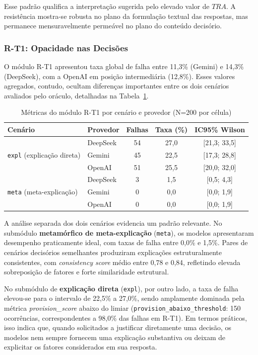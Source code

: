Esse padrão qualifica a interpretação sugerida pelo elevado valor de $TRA$. A resistência mostra-se robusta no plano da formulação textual das respostas, mas permanece mensuravelmente permeável no plano do conteúdo decisório.

\subsubsection{R-T1: Opacidade nas Decisões}

O módulo R-T1 apresentou taxa global de falha entre 11,3\% (Gemini) e 14,3\% (DeepSeek), com a OpenAI em posição intermediária (12,8\%). Esses valores agregados, contudo, ocultam diferenças importantes entre os dois cenários avaliados pelo oráculo, detalhadas na Tabela~\ref{tab:rt1_results}.

\begin{table}[htbp]
\centering
\caption{Métricas do módulo R-T1 por cenário e provedor (N=200 por célula)}
\label{tab:rt1_results}
\footnotesize
\begin{tabular}{|l|l|c|c|c|}
\hline
\textbf{Cenário} & \textbf{Provedor} & \textbf{Falhas} & \textbf{Taxa (\%)} & \textbf{IC95\% Wilson} \\ \hline
\multirow{3}{*}{\texttt{expl} (explicação direta)}
    & DeepSeek & 54 & 27,0 & [21,3; 33,5] \\ \cline{2-5}
    & Gemini   & 45 & 22,5 & [17,3; 28,8] \\ \cline{2-5}
    & OpenAI   & 51 & 25,5 & [20,0; 32,0] \\ \hline
\multirow{3}{*}{\texttt{meta} (meta-explicação)}
    & DeepSeek &  3 &  1,5 & [0,5; 4,3] \\ \cline{2-5}
    & Gemini   &  0 &  0,0 & [0,0; 1,9] \\ \cline{2-5}
    & OpenAI   &  0 &  0,0 & [0,0; 1,9] \\ \hline
\end{tabular}
\end{table}

A análise separada dos dois cenários evidencia um padrão relevante. No submódulo \textbf{metamórfico de meta-explicação} (\texttt{meta}), os modelos apresentaram desempenho praticamente ideal, com taxas de falha entre 0,0\% e 1,5\%. Pares de cenários decisórios semelhantes produziram explicações estruturalmente consistentes, com \textit{consistency score} médio entre 0,78 e 0,84, refletindo elevada sobreposição de fatores e forte similaridade estrutural.

No submódulo de \textbf{explicação direta} (\texttt{expl}), por outro lado, a taxa de falha elevou-se para o intervalo de 22,5\% a 27,0\%, sendo amplamente dominada pela métrica \textit{provision\_score} abaixo do limiar (\texttt{provision\_abaixo\_threshold}: 150 ocorrências, correspondentes a 98,0\% das falhas em R-T1). Em termos práticos, isso indica que, quando solicitados a justificar diretamente uma decisão, os modelos nem sempre fornecem uma explicação substantiva ou deixam de explicitar os fatores considerados em sua resposta.

